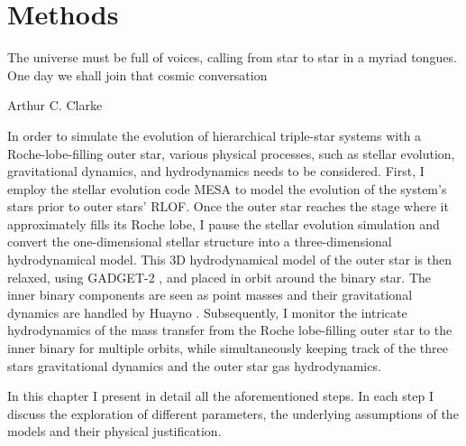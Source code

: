 \chapter{Methods}\label{methods}

\epigraph{The universe must be full of voices, calling from star to star in a myriad tongues. One day we shall join that cosmic conversation}{Arthur C. Clarke}

In order to simulate the evolution of hierarchical triple-star systems with a  Roche-lobe-filling outer star, various physical processes, such as stellar evolution, gravitational dynamics, and hydrodynamics needs to be considered. First, I employ the stellar evolution code MESA \citep{paxton2010modules,paxton2013modules,paxton2015modules,paxton2019modules} to model the evolution of the system's stars prior to outer stars' RLOF. Once the outer star reaches the stage where it approximately fills its Roche lobe, I pause the stellar evolution simulation and convert the one-dimensional stellar structure into a three-dimensional hydrodynamical model. This 3D hydrodynamical model of the outer star is then relaxed, using GADGET-2 \citep{springel2005cosmological}, and placed in orbit around the binary star. The inner binary components are seen as point masses and their gravitational dynamics are handled by Huayno \citep{pelupessy2012n}. Subsequently, I monitor the intricate hydrodynamics of the mass transfer from the Roche lobe-filling outer star to the inner binary for multiple orbits, while simultaneously keeping track of the three stars gravitational dynamics and the outer star gas hydrodynamics. 

In this chapter I present in detail all the aforementioned steps. In each step I discuss the exploration of different parameters, the underlying assumptions of the models and their physical justification.






